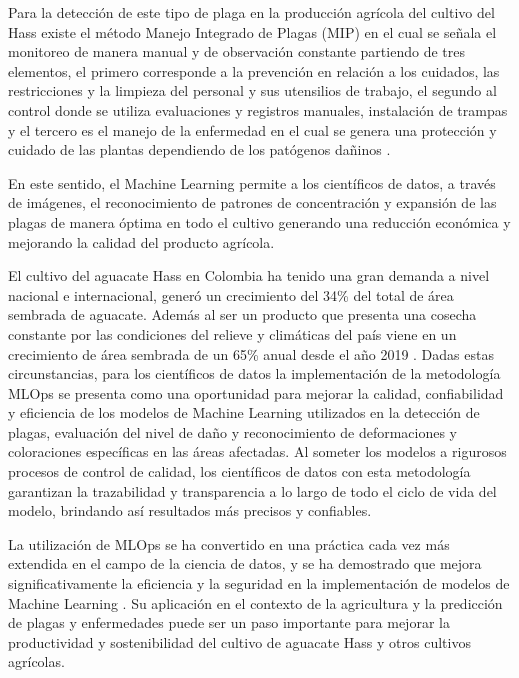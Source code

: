 Para la detección de este tipo de plaga en la producción agrícola del cultivo del Hass existe el método Manejo Integrado de Plagas (MIP) en el cual se señala el monitoreo de manera manual y de observación constante partiendo de tres elementos, el primero corresponde a la prevención en relación a los cuidados, las restricciones y la limpieza del personal y sus utensilios de trabajo, el segundo al control donde se utiliza evaluaciones y registros manuales, instalación de trampas y el tercero es el manejo de la enfermedad en el cual se genera una protección y cuidado de las plantas dependiendo de los patógenos dañinos \citep{ica2012manejo}.

En este sentido, el Machine Learning permite a los científicos de datos, a través de imágenes, el reconocimiento de patrones de concentración y expansión de las plagas de manera óptima en todo el cultivo generando una reducción económica y mejorando la calidad del producto agrícola.

El cultivo del aguacate Hass en Colombia ha tenido una gran demanda a nivel nacional e internacional, generó un crecimiento del 34\% del total de área sembrada de aguacate. Además al ser un producto que presenta una cosecha constante por las condiciones del relieve y climáticas del país viene en un crecimiento de área sembrada de un 65\% anual desde el año 2019 \citep{proyectocolombiamide2021}. Dadas estas circunstancias, para los científicos de datos la implementación de la metodología MLOps se presenta como una oportunidad para mejorar la calidad, confiabilidad y eficiencia de los modelos de Machine Learning utilizados en la detección de plagas, evaluación del nivel de daño y reconocimiento de deformaciones y coloraciones específicas en las áreas afectadas. Al someter los modelos a rigurosos procesos de control de calidad, los científicos de datos con esta metodología garantizan la trazabilidad y transparencia a lo largo de todo el ciclo de vida del modelo, brindando así resultados más precisos y confiables.

\newpage
La utilización de MLOps se ha convertido en una práctica cada vez más extendida en el campo de la ciencia de datos, y se ha demostrado que mejora significativamente la eficiencia y la seguridad en la implementación de modelos de Machine Learning \citep{geron2019hands}. Su aplicación en el contexto de la agricultura y la predicción de plagas y enfermedades puede ser un paso importante para mejorar la productividad y sostenibilidad del cultivo de aguacate Hass y otros cultivos agrícolas.

